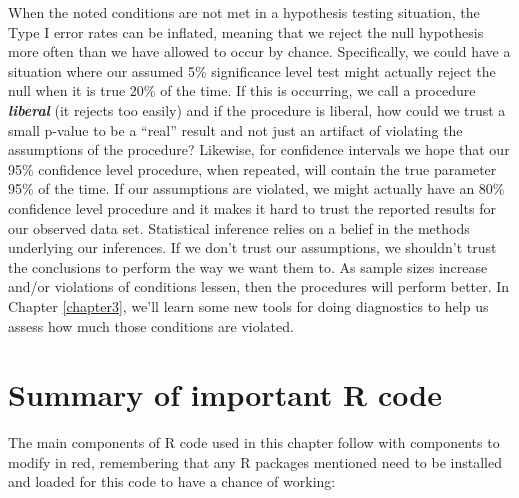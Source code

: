 \documentclass[]{book}
\begin{document}
When the noted conditions are not met in a hypothesis testing situation,
the Type I error rates can be inflated, meaning that we reject the null
hypothesis more often than we have allowed to occur by chance.
Specifically, we could have a situation where our assumed 5\%
significance level test might actually reject the null when it is true
20\% of the time. If this is occurring, we call a procedure
\textbf{\emph{liberal}} (it rejects too easily) and if the procedure is
liberal, how could we trust a small p-value to be a ``real'' result and
not just an artifact of violating the assumptions of the procedure?
Likewise, for confidence intervals we hope that our 95\% confidence
level procedure, when repeated, will contain the true parameter 95\% of
the time. If our assumptions are violated, we might actually have an
80\% confidence level procedure and it makes it hard to trust the
reported results for our observed data set. Statistical inference relies
on a belief in the methods underlying our inferences. If we don't trust
our assumptions, we shouldn't trust the conclusions to perform the way
we want them to. As sample sizes increase and/or violations of
conditions lessen, then the procedures will perform better. In Chapter
\ref{chapter3}, we'll learn some new tools for doing diagnostics to help
us assess how much those conditions are violated.

\section{Summary of important R code}\label{section2-11}

The main components of R code used in this chapter follow with
components to modify in red, remembering that any R packages mentioned
need to be installed and loaded for this code to have a chance of
working:
\end{document}
